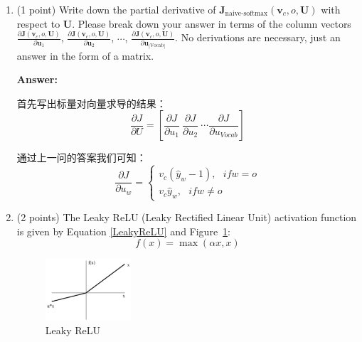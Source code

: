 \documentclass{article}
\newenvironment{answer}{
    {\bf Answer:} \sf \begingroup\color{red}
}{\endgroup}%
\begin{document}
\begin{enumerate}[label=(\alph*)]
\item (1 point) Write down the partial derivative of $\bm J_{\text{naive-softmax}}(\bm v_c, o, \bm U)$ with respect to $\bm U$. Please break down your answer in terms of the column vectors $\frac{\partial \bm J(\bm v_c, o, \bm U)}{\partial \bm u_1}$, $\frac{\partial \bm J(\bm v_c, o, \bm U)}{\partial \bm u_2}$, $\cdots$, $\frac{\partial \bm J(\bm v_c, o, \bm U)}{\partial \bm u_{|\text{Vocab}|}}$. No derivations are necessary, just an answer in the form of a matrix.
\begin{shaded}
\begin{answer}
	首先写出标量对向量求导的结果：
	\begin{equation}
		\frac{\partial J}{\partial U} = \left[ \frac{\partial J}{\partial u_1}\ \frac{\partial J}{\partial u_2}\ \cdots \frac{\partial J}{\partial u_{Vocab}} \right]
	\end{equation}
	
	通过上一问的答案我们可知：
	\begin{equation}
	\frac{\partial J}{\partial u_w} = \left\{
	\begin{array}{l}
		v_c (\hat{y}_{w} - 1),\ \ \ if w=o \\
		v_c \hat{y}_{w}, \ \ \ if w\neq o
	\end{array}
	\right.
\end{equation}


\end{answer}
\end{shaded}

\item (2 points) The Leaky ReLU (Leaky Rectified Linear Unit) activation function is given by Equation \ref{LeakyReLU} and Figure~\ref{fig:leaky_relu}:
\begin{equation}
    \label{LeakyReLU}
    f(x) = \max(\alpha x, x)
\end{equation}

\begin{figure}[h]
    \centering
    \includegraphics[width=0.3\textwidth]{leaky_relu_graph.png}
    \caption{Leaky ReLU}
    \label{fig:leaky_relu}
\end{figure}


\end{enumerate}
\end{document}
